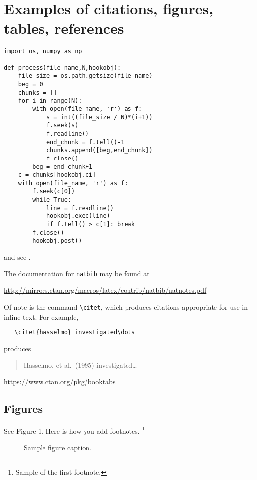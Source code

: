 \documentclass{article}
\begin{document}
\section{Examples of citations, figures, tables, references}

\begin{verbatim}
import os, numpy as np

def process(file_name,N,hookobj):
    file_size = os.path.getsize(file_name)
    beg = 0
    chunks = []
    for i in range(N):
        with open(file_name, 'r') as f:
            s = int((file_size / N)*(i+1))
            f.seek(s)
            f.readline()
            end_chunk = f.tell()-1
            chunks.append([beg,end_chunk])
            f.close()
        beg = end_chunk+1
    c = chunks[hookobj.ci]
    with open(file_name, 'r') as f:
        f.seek(c[0])
        while True:
            line = f.readline()
            hookobj.exec(line)
            if f.tell() > c[1]: break
        f.close()
        hookobj.post()
\end{verbatim}






\label{sec:others}
\lipsum[8] \cite{kour2014real,kour2014fast} and see \cite{hadash2018estimate}.

The documentation for \verb+natbib+ may be found at
\begin{center}
  \url{http://mirrors.ctan.org/macros/latex/contrib/natbib/natnotes.pdf}
\end{center}
Of note is the command \verb+\citet+, which produces citations
appropriate for use in inline text.  For example,
\begin{verbatim}
   \citet{hasselmo} investigated\dots
\end{verbatim}
produces
\begin{quote}
  Hasselmo, et al.\ (1995) investigated\dots
\end{quote}

\begin{center}
  \url{https://www.ctan.org/pkg/booktabs}
\end{center}


\subsection{Figures}
\lipsum[10] 
See Figure \ref{fig:fig1}. Here is how you add footnotes. \footnote{Sample of the first footnote.}
\lipsum[11] 

\begin{figure}
  \centering
  \fbox{\rule[-.5cm]{4cm}{4cm} \rule[-.5cm]{4cm}{0cm}}
  \caption{Sample figure caption.}
  \label{fig:fig1}
\end{figure}
\end{document}
